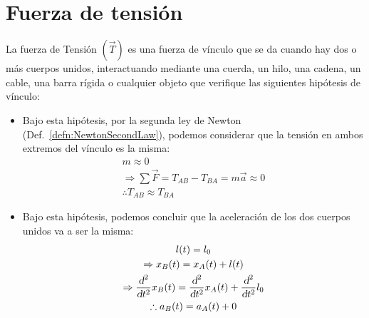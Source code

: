 \documentclass[a5paper,12pt,twoside]{book}
\begin{document}
\section{Fuerza de tensión}

La fuerza de Tensión $(\Vec{T})$ es una fuerza de vínculo que se da cuando hay dos o más cuerpos unidos, interactuando mediante una cuerda, un hilo, una cadena, un cable, una barra rígida o cualquier objeto que verifique las siguientes hipótesis de vínculo:
\begin{itemize}
  \item {}

  Bajo esta hipótesis, por la segunda ley de Newton (Def.\ \ref{defn:NewtonSecondLaw}), podemos considerar que la tensión en ambos extremos del vínculo es la misma:
  \begin{gather*}
     m \approx 0
     \\
     \Rightarrow \sum \Vec{F} = T_{AB}-T_{BA} = m \Vec{a} \approx 0
     \\
     \therefore T_{AB} \approx T_{BA}
  \end{gather*}
  
  \item {}

  Bajo esta hipótesis, podemos concluir que la aceleración de los dos cuerpos unidos va a ser la misma:
  \begin{gather*}
    l(t) = l_0
    \\
    \Rightarrow x_B(t) = x_A(t) + l(t)
    \\
    \Rightarrow \dfrac{\textsl{d}^2}{\textsl{d} t^2} x_B(t) = \dfrac{\textsl{d}^2}{\textsl{d} t^2} x_A(t) + \dfrac{\textsl{d}^2}{\textsl{d} t^2} l_0
    \\
    \therefore a_B(t) = a_A(t) +0
  \end{gather*}
\end{itemize}
\end{document}
